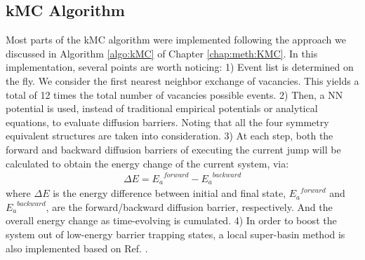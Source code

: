 \subsection{\acf{kMC} Algorithm}
Most parts of the \ac{kMC} algorithm were implemented following the approach we discussed in Algorithm \ref{algo:kMC} of Chapter \ref{chap:meth:KMC}. In this implementation, several points are worth noticing: 1) Event list is determined on the fly. We consider the first nearest neighbor exchange of vacancies. This yields a total of 12 times the total number of vacancies possible events. 2) Then, a \ac{NN} potential is used, instead of traditional empirical potentials or analytical equations, to evaluate diffusion barriers. Noting that all the four symmetry equivalent structures are taken into consideration. 3) At each step, both the forward and backward diffusion barriers of executing the current jump will be calculated to obtain the energy change of the current system, via:
\begin{align}
\Delta E = {E_a}^{forward} - {E_a}^{backward}
\label{Chap:Al/Vac:eq:barrier-EDiff}
\end{align}
where $\Delta E$ is the energy difference between initial and final state, ${E_a}^{forward}$ and ${E_a}^{backward}$, are the forward/backward diffusion barrier, respectively. And the overall energy change as time-evolving is cumulated. 4) In order to boost the system out of low-energy barrier trapping states, a local super-basin method is also implemented based on Ref. \cite{fichthorn2013local}.


